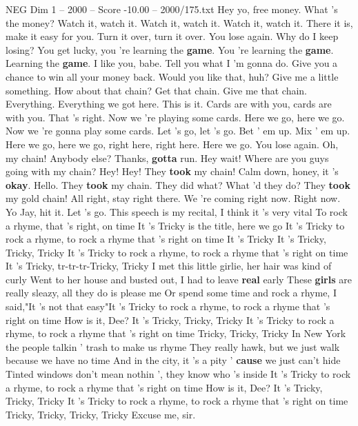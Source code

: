 \begin{textsample}{NEG Dim 1 – 2000 – Score -10.00 – 2000/175.txt}  \label{ex:f1_neg_005}
Hey yo, free money.
What 's the money?
Watch it, watch it.
Watch it, watch it.
Watch it, watch it.
There it is, make it easy for you.
Turn it over, turn it over.
You lose again.
Why do I keep losing?
You get lucky, you 're learning the \textbf{game}.
You 're learning the \textbf{game}.
Learning the \textbf{game}.
I like you, babe.
Tell you what I 'm gonna do.
Give you a chance to win all your money back.
Would you like that, huh?
Give me a little something.
How about that chain?
Get that chain.
Give me that chain.
Everything.
Everything we got here.
This is it.
Cards are with you, cards are with you.
That 's right.
Now we 're playing some cards.
Here we go, here we go.
Now we 're gonna play some cards.
Let 's go, let 's go.
Bet ' em up.
Mix ' em up.
Here we go, here we go, right here, right here.
Here we go.
You lose again.
Oh, my chain!
Anybody else?
Thanks, \textbf{gotta} run.
Hey wait!
Where are you guys going with my chain?
Hey!
Hey!
They \textbf{took} my chain!
Calm down, honey, it 's \textbf{okay}.
Hello.
They \textbf{took} my chain.
They did what?
What 'd they do?
They \textbf{took} my gold chain!
All right, stay right there.
We 're coming right now.
Right now.
Yo Jay, hit it.
Let 's go.
This speech is my recital, I think it 's very vital To rock a rhyme, that 's right, on time It 's Tricky is the title, here we go It 's Tricky to rock a rhyme, to rock a rhyme that 's right on time It 's Tricky It 's Tricky, Tricky, Tricky It 's Tricky to rock a rhyme, to rock a rhyme that 's right on time It 's Tricky, tr-tr-tr-Tricky, Tricky I met this little girlie, her hair was kind of curly Went to her house and busted out, I had to leave \textbf{real} early These \textbf{girls} are really sleazy, all they do is please me Or spend some time and rock a rhyme, I said,"It 's not that easy"It 's Tricky to rock a rhyme, to rock a rhyme that 's right on time How is it, Dee?
It 's Tricky, Tricky, Tricky It 's Tricky to rock a rhyme, to rock a rhyme that 's right on time Tricky, Tricky, Tricky In New York the people talkin ' trash to make us rhyme They really hawk, but we just walk because we have no time And in the city, it 's a pity ' \textbf{cause} we just can't hide Tinted windows don't mean nothin ', they know who 's inside It 's Tricky to rock a rhyme, to rock a rhyme that 's right on time How is it, Dee?
It 's Tricky, Tricky, Tricky It 's Tricky to rock a rhyme, to rock a rhyme that 's right on time Tricky, Tricky, Tricky, Tricky Excuse me, sir.

\end{textsample}
